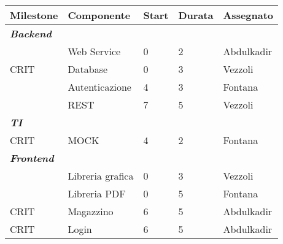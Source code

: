 \documentclass[../../documentazione.tex]{subfiles}
\begin{document}
    \begin{table}[]
        \begin{tabular}{lllll}
            \hline
            \multicolumn{1}{|l}{\textbf{Milestone}} & \textbf{Componente}                   & \textbf{Start} & \textbf{Durata} & \multicolumn{1}{l|}{\textbf{Assegnato}} \\ \hline
            \textit{\textbf{Backend}}               & \multicolumn{1}{l|}{\textbf{}}        & \textbf{}                & \textbf{}       &                                         \\ \hline
            & \multicolumn{1}{l|}{Web Service}      & 0                        & 2               & Abdulkadir                              \\
            CRIT& \multicolumn{1}{l|}{Database}         & 0                        & 3               & Vezzoli                                 \\
            & \multicolumn{1}{l|}{Autenticazione}   & 4                        & 3               & Fontana                                 \\
            & \multicolumn{1}{l|}{REST}             & 7                        & 5               & Vezzoli                                 \\
            \textit{\textbf{TI}}   & \multicolumn{1}{l|}{}                 &                          &                 &                                         \\ \hline
            CRIT& \multicolumn{1}{l|}{MOCK}             & 4                        & 2               & Fontana                                 \\
            \textit{\textbf{Frontend}}              & \multicolumn{1}{l|}{}                 &                          &                 &                                         \\ \hline
            & \multicolumn{1}{l|}{Libreria grafica} & 0                        & 3               & Vezzoli                                 \\
            & \multicolumn{1}{l|}{Libreria PDF}     & 0                        & 5               & Fontana                                 \\
            CRIT& \multicolumn{1}{l|}{Magazzino}        & 6                        & 5               & Abdulkadir                              \\
            CRIT& \multicolumn{1}{l|}{Login}            & 6                        & 5               & Abdulkadir                              \\

\end{tabular}
\end{table}
\end{document}
